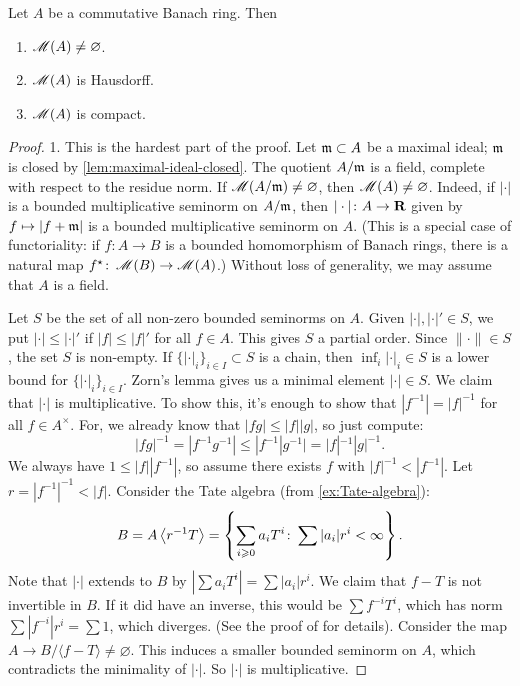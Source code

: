 \begin{theorem}\label{thm:Berkspec-not-empty}
Let $A$ be a commutative Banach ring. Then 
\begin{enumerate}
\item
$\operatorname{\mathscr{M}}(A)\ne\varnothing$. 

\item
$\operatorname{\mathscr{M}}(A)$ is Hausdorff. 

\item
$\operatorname{\mathscr{M}}(A)$ is compact. 
\end{enumerate}
\end{theorem}
\begin{proof}
1. This is the hardest part of the proof. Let $\mathfrak{m}\subset A$ be a maximal 
ideal; $\mathfrak{m}$ is closed by \autoref{lem:maximal-ideal-closed}. The quotient 
$A/\mathfrak{m}$ is a field, complete with respect to the residue norm. If 
$\operatorname{\mathscr{M}}(A/\mathfrak{m})\ne\varnothing$, then $\operatorname{\mathscr{M}}(A)\ne\varnothing$. Indeed, 
if $|\cdot|$ is a bounded multiplicative seminorm on $A/\mathfrak{m}$, then 
$|\cdot|\colon A\to \mathbf{R}$ given by $f\mapsto |f+\mathfrak{m}|$ is a bounded 
multiplicative seminorm on $A$. (This is a special case of functoriality: if 
$f\colon A\to B$ is a bounded homomorphism of Banach rings, there is a natural 
map $f^\star\colon \operatorname{\mathscr{M}}(B)\to \operatorname{\mathscr{M}}(A)$.) Without loss of generality, 
we may assume that $A$ is a field. 

Let $S$ be the set of all non-zero bounded seminorms on $A$. Given 
$|\cdot|,|\cdot|'\in S$, we put $|\cdot|\leqslant |\cdot|'$ if 
$|f|\leqslant |f|'$ for all $f\in A$. This gives $S$ a partial order. Since 
$\|\cdot\|\in S$, the set $S$ is non-empty. If 
$\{|\cdot|_i\}_{i\in I}\subset S$ is a chain, then $\inf_i |\cdot|_i\in S$ is 
a lower bound for $\{|\cdot|_i\}_{i\in I}$. Zorn's lemma gives us a minimal 
element $|\cdot|\in S$. We claim that 
$|\cdot|$ is multiplicative. To show this, it's enough to show that 
$|f^{-1}| = |f|^{-1}$ for all $f\in A^\times$. For, we already know that 
$|f g|\leqslant |f| |g|$, so just compute:
\[
  |f g|^{-1} = |f^{-1} g^{-1}| \leqslant |f^{-1} |g^{-1}| = |f|^{-1} |g|^{-1} .
\]
We always have $1\leqslant |f| |f^{-1}|$, so assume there exists $f$ with 
$|f|^{-1}<|f^{-1}|$. Let $r=|f^{-1}|^{-1}<|f|$. Consider the 
Tate algebra (from \autoref{ex:Tate-algebra}):
\[
  B = A\left\langle r^{-1} T \right\rangle = \left\{\sum_{i\geqslant 0} a_i T^i\colon \sum |a_i| r^i < \infty\right\} .
\]
Note that $|\cdot|$ extends to $B$ by $|\sum a_i T^i| = \sum |a_i| r^i$. We 
claim that $f-T$ is not invertible in $B$. If it did have an inverse, this 
would be $\sum f^{-i} T^i$, which has norm $\sum |f^{-i}| r^i = \sum 1$, which 
diverges. (See the proof of \cite[1.2.1]{berkovich-1990} for details). Consider 
the map $A\to B/\langle f-T\rangle\ne\varnothing$. This induces a smaller 
bounded seminorm on $A$, which contradicts the minimality of $|\cdot|$. So 
$|\cdot|$ is multiplicative. 


\end{proof}

